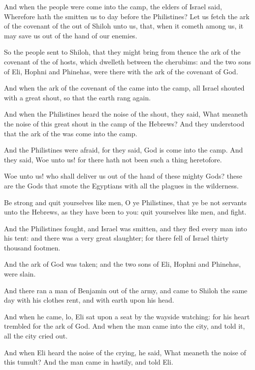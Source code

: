 \Verse And when the people were come into the camp, the elders of Israel said, Wherefore hath the \LORD smitten us to day before the Philistines? Let us fetch the ark of the covenant of the \LORD out of Shiloh unto us, that, when it cometh among us, it may save us out of the hand of our enemies.

\Verse So the people sent to Shiloh, that they might bring from thence the ark of the covenant of the \LORD of hosts, which dwelleth between the cherubims: and the two sons of Eli, Hophni and Phinehas, were there with the ark of the covenant of God.

\Verse And when the ark of the covenant of the \LORD came into the camp, all Israel shouted with a great shout, so that the earth rang again.

\Verse And when the Philistines heard the noise of the shout, they said, What meaneth the noise of this great shout in the camp of the Hebrews?  And they understood that the ark of the \LORD was come into the camp.

\Verse And the Philistines were afraid, for they said, God is come into the camp. And they said, Woe unto us! for there hath not been such a thing heretofore.

\Verse Woe unto us! who shall deliver us out of the hand of these mighty Gods? these are the Gods that smote the Egyptians with all the plagues in the wilderness.

\Verse Be strong and quit yourselves like men, O ye Philistines, that ye be not servants unto the Hebrews, as they have been to you: quit yourselves like men, and fight.

\Verse And the Philistines fought, and Israel was smitten, and they fled every man into his tent: and there was a very great slaughter; for there fell of Israel thirty thousand footmen.

\Verse And the ark of God was taken; and the two sons of Eli, Hophni and Phinehas, were slain.

\Verse And there ran a man of Benjamin out of the army, and came to Shiloh the same day with his clothes rent, and with earth upon his head.

\Verse And when he came, lo, Eli sat upon a seat by the wayside watching: for his heart trembled for the ark of God. And when the man came into the city, and told it, all the city cried out.

\Verse And when Eli heard the noise of the crying, he said, What meaneth the noise of this tumult? And the man came in hastily, and told Eli.


